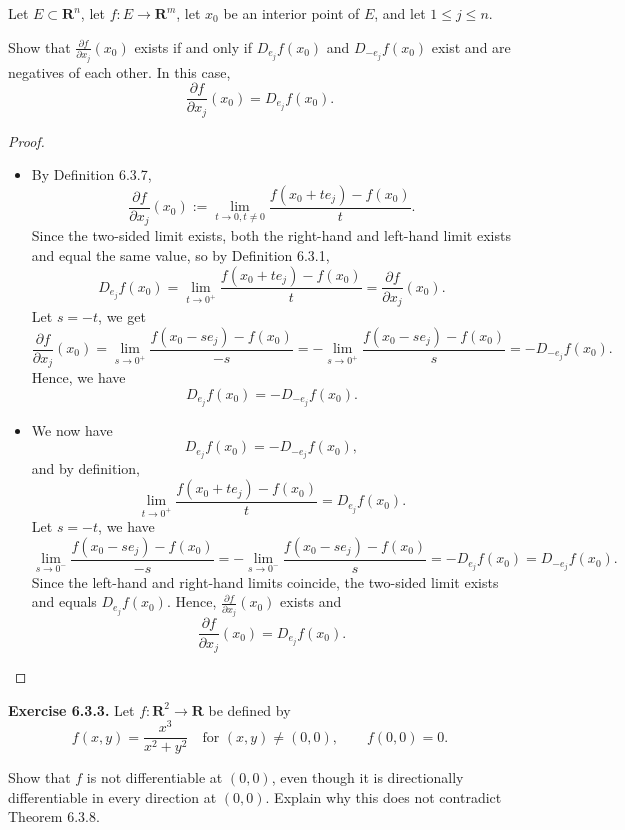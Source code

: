 \begin{problem}
    Let $E \subset \mathbf{R}^n$, let $f : E \to \mathbf{R}^m$, let $x_0$ be an interior point of $E$, and let $1 \le j \le n$.

Show that $\frac{\partial f}{\partial x_j}(x_0)$ exists if and only if
$D_{e_j}f(x_0)$ and $D_{-e_j}f(x_0)$ exist and are negatives of each other.
In this case,
$$
\frac{\partial f}{\partial x_j}(x_0)
=
D_{e_j}f(x_0).
$$
\end{problem}
\begin{proof}
    \vphantom{text}
    \begin{itemize}
        \item [\((\implies )\)] By Definition 6.3.7,
        \[
        \frac{\partial f}{\partial x_j}(x_0):= \lim_{t\rightarrow0,t\ne0}\frac{f(x_0+te_j)-f(x_0)}{t}.
        \]
    Since the two-sided limit exists, both the right-hand and left-hand limit exists and equal the same value, so by Definition 6.3.1,
    \[
    D_{e_{j}}f(x_{0}) = \lim_{t\rightarrow0^{+}}\frac{f(x_{0}+te_{j})-f(x_{0})}{t} = \frac{\partial f}{\partial x_j}(x_0).
    \]
    Let $s=-t$, we get
    \[
    \frac{\partial f}{\partial x_j}(x_0) = \lim_{s\rightarrow0^{+}}\frac{f(x_{0}-se_{j})-f(x_{0})}{-s} = -\lim_{s\rightarrow0^{+}}\frac{f(x_{0}-se_{j})-f(x_{0})}{s} = -D_{-e_{j}}f(x_{0}).
    \]
    Hence, we have
    \[
    D_{e_{j}}f(x_{0}) = -D_{-e_{j}}f(x_{0}).
    \]
    \item [\((\impliedby )\)] We now have
    \[
    D_{e_{j}}f(x_{0}) = -D_{-e_{j}}f(x_{0}),
    \]
    and by definition,
    \[
    \lim_{t\rightarrow0^{+}}\frac{f(x_{0}+te_{j})-f(x_{0})}{t} = D_{e_{j}}f(x_{0}).
    \]
    Let $s=-t$, we have
    \[
     \lim_{s\rightarrow0^{-}}\frac{f(x_{0}-se_{j})-f(x_{0})}{-s} = -\lim_{s\rightarrow0^{-}}\frac{f(x_{0}-se_{j})-f(x_{0})}{s} = -D_{e_{j}}f(x_{0}) = D_{-e_{j}}f(x_{0}).
    \]
    Since the left-hand and right-hand limits coincide, the two-sided limit exists and equals $D_{e_{j}}f(x_{0})$. Hence, $\frac{\partial f}{\partial x_j}(x_0)$ exists and
    \[
    \frac{\partial f}{\partial x_j}(x_0) = D_{e_j}f(x_0).
    \]
    \end{itemize}
     
\end{proof}

\begin{problem}
    \textbf{Exercise 6.3.3.}
Let $f : \mathbf{R}^2 \to \mathbf{R}$ be defined by
$$
f(x,y)
=
\frac{x^3}{x^2 + y^2}
\quad \text{for } (x,y) \ne (0,0),
\qquad
f(0,0) = 0.
$$

Show that $f$ is not differentiable at $(0,0)$, even though it is
directionally differentiable in every direction at $(0,0)$.
Explain why this does not contradict Theorem 6.3.8.

\end{problem}

